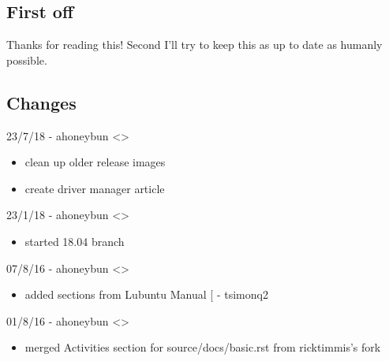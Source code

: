 \documentclass[letterpaper,10pt,english]{sphinxmanual}
\begin{document}
\subsection{First off}
\label{\detokenize{docs/appendix/changes:first-off}}
Thanks for reading this! Second I’ll try to keep this as up to date as humanly possible.


\subsection{Changes}
\label{\detokenize{docs/appendix/changes:changes}}
23/7/18 - ahoneybun \textless{}\textgreater{}
\begin{itemize}
\item {} 
clean up older release images

\item {} 
create driver manager article

\end{itemize}

23/1/18 - ahoneybun \textless{}\textgreater{}
\begin{itemize}
\item {} 
started 18.04 branch

\end{itemize}

07/8/16 - ahoneybun \textless{}\textgreater{}
\begin{itemize}
\item {} 
added sections from Lubuntu Manual {[}\sphinxurl{https://github.com/tsimonq2/lubuntu-manual}{]}
- tsimonq2

\end{itemize}

01/8/16 - ahoneybun \textless{}\textgreater{}
\begin{itemize}
\item {} 
merged Activities section for source/docs/basic.rst from ricktimmis’s fork

\end{itemize}
\end{document}
